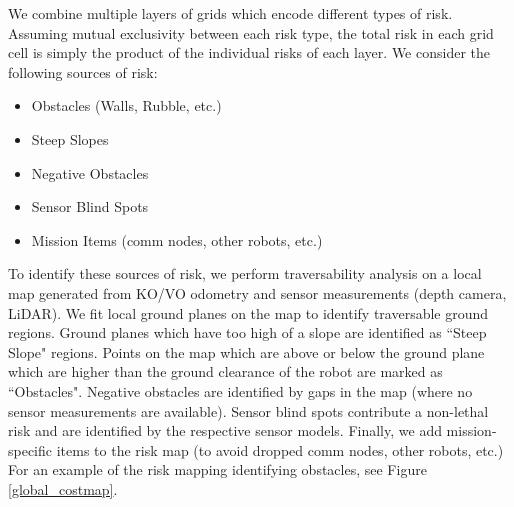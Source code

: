 \documentclass[letterpaper, 10 pt, conference]{ieeeconf}  %
\newcommand{\pr}[1]{\textbf{#1:}}  %
\newcommand{\ph}[1]{\pr{#1}} %
\begin{document}
We combine multiple layers of grids which encode different types of risk.  Assuming mutual exclusivity between each risk type, the total risk in each grid cell is simply the product of the individual risks of each layer.  We consider the following sources of risk:
\begin{itemize}
    \item Obstacles (Walls, Rubble, etc.)
    \item Steep Slopes
    \item Negative Obstacles
    \item Sensor Blind Spots
    \item Mission Items (comm nodes, other robots, etc.)
\end{itemize}
To identify these sources of risk, we perform traversability analysis on a local map generated from KO/VO odometry and sensor measurements (depth camera, LiDAR).  We fit local ground planes on the map to identify traversable ground regions.  Ground planes which have too high of a slope are identified as ``Steep Slope" regions.  Points on the map which are above or below the ground plane which are higher than the ground clearance of the robot are marked as ``Obstacles".  Negative obstacles are identified by gaps in the map (where no sensor measurements are available).  Sensor blind spots contribute a non-lethal risk and are identified by the respective sensor models.  Finally, we add mission-specific items to the risk map (to avoid dropped comm nodes, other robots, etc.) For an example of the risk mapping identifying obstacles, see Figure \ref{global_costmap}.
\end{document}
